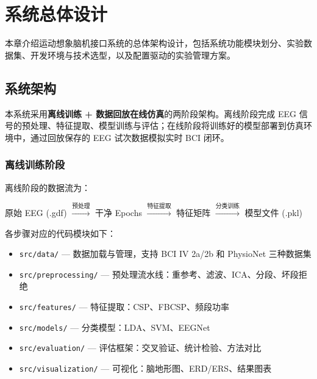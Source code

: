\section{系统总体设计}
\label{sec:system-design}

本章介绍运动想象脑机接口系统的总体架构设计，包括系统功能模块划分、实验数据集、开发环境与技术选型，以及配置驱动的实验管理方案。

\subsection{系统架构}
\label{sec:architecture}

本系统采用\textbf{离线训练 + 数据回放在线仿真}的两阶段架构。离线阶段完成 EEG 信号的预处理、特征提取、模型训练与评估；在线阶段将训练好的模型部署到仿真环境中，通过回放保存的 EEG 试次数据模拟实时 BCI 闭环。

\subsubsection{离线训练阶段}

离线阶段的数据流为：

\begin{center}
原始 EEG (.gdf) $\xrightarrow{\text{预处理}}$ 干净 Epochs $\xrightarrow{\text{特征提取}}$ 特征矩阵 $\xrightarrow{\text{分类训练}}$ 模型文件 (.pkl)
\end{center}

各步骤对应的代码模块如下：

\begin{itemize}[leftmargin=2em]
	\item \texttt{src/data/} — 数据加载与管理，支持 BCI IV 2a/2b 和 PhysioNet 三种数据集
	\item \texttt{src/preprocessing/} — 预处理流水线：重参考、滤波、ICA、分段、坏段拒绝
	\item \texttt{src/features/} — 特征提取：CSP、FBCSP、频段功率
	\item \texttt{src/models/} — 分类模型：LDA、SVM、EEGNet
	\item \texttt{src/evaluation/} — 评估框架：交叉验证、统计检验、方法对比
	\item \texttt{src/visualization/} — 可视化：脑地形图、ERD/ERS、结果图表
\end{itemize}

